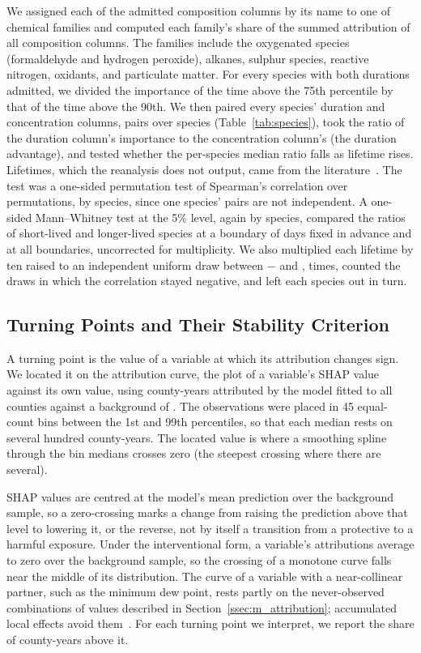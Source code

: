 \documentclass[sensors,article,submit,moreauthors,pdftex]{Definitions/mdpi}
\begin{document}
We assigned each of the \CompN{}
admitted composition columns by its name to one of \FamN{} chemical families
and computed each family's share of the summed attribution of all composition
columns. The families include the oxygenated species (formaldehyde and
hydrogen peroxide), alkanes, sulphur species, reactive nitrogen, oxidants, and
particulate matter. For every species with both durations admitted, we
divided the importance of the time above the 75th percentile by that of the time above the 90th.
We then paired every
species' duration and concentration columns, \LtPairs{} pairs over
\LtSpecies{} species (Table~\ref{tab:species}), took the ratio of the duration column's
importance to the concentration column's (the duration advantage), and tested whether the per-species median ratio falls as
lifetime rises. Lifetimes, which the reanalysis does not output, came from the
literature~\cite{Seinfeld2016,
AtkinsonArey2003, FinlaysonPitts2000, Lelieveld2016, Textor2006, Young2013,
Fischer2014}. The test was a one-sided permutation test of Spearman's
correlation over \LtPerms{} permutations, by species, since one species' pairs are not independent. A one-sided
Mann--Whitney test at the 5\% level, again by species, compared the ratios of
short-lived and longer-lived species at a boundary of \LtCutoff{} days fixed in
advance and at all \LtSweepN{} boundaries, uncorrected for multiplicity. We also
multiplied each lifetime by ten raised to an independent uniform draw between
$-$\LtValueDex{} and \LtValueDex{}, \LtValueDraws{} times, counted the draws in which the
correlation stayed negative, and left each species out in turn.

\subsection{Turning Points and Their Stability Criterion}
\label{ssec:m_turning}
A turning point is the value of a variable at which its attribution changes sign. We located it on the attribution curve, the plot of a
variable's SHAP value against its own value, using \GateShapN{} county-years
attributed by the model fitted to all counties against a background of
\InvShapBackground{}. The observations were placed in 45 equal-count bins
between the 1st and 99th percentiles, so that each median rests on several
hundred county-years. The located value is where a smoothing spline
through the bin medians crosses zero (the steepest crossing where there are
several).

SHAP values are centred at the model's mean prediction over the
background sample, so a zero-crossing marks a change from raising the prediction above that level
to lowering it, or the reverse, not by itself a transition from a
protective to a harmful exposure. Under the interventional form, a variable's
attributions average to zero over the background sample, so the crossing of a
monotone curve falls near the middle of its distribution. The curve of a
variable with a near-collinear partner, such as the minimum dew point, rests
partly on the never-observed combinations of values described in
Section~\ref{ssec:m_attribution}; accumulated local effects avoid
them~\cite{Apley2020}. For each turning point we interpret, we report the
share of county-years above it.
\end{document}
